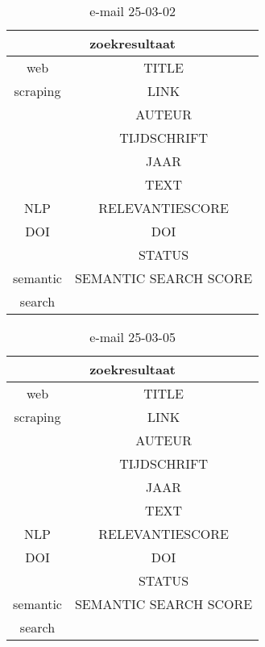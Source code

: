 \begin{table}[h!]
    \caption{e-mail 25-03-02}
    \centering
    \begin{tabular}{|c|c|} 
        \hline
        \multicolumn{2}{|c|}{\textbf{zoekresultaat}} \\
        \hline
        web &TITLE\\
        scraping&LINK\\
        &AUTEUR\\
        &TIJDSCHRIFT\\
        &JAAR\\
        &TEXT\\
        \hline
        NLP&RELEVANTIESCORE\\
        \hline
        DOI&DOI\\
        &STATUS\\
        \hline
        semantic&SEMANTIC SEARCH SCORE\\
        search&\\
        \hline
    \end{tabular}
    \label{table:email20250302}
\end{table}
\begin{table}[h!]
    \caption{e-mail 25-03-05}
    \centering
    \begin{tabular}{|c|c|} 
        \hline
        \multicolumn{2}{|c|}{\textbf{zoekresultaat}} \\
        \hline
        web &TITLE\\
        scraping&LINK\\
        &AUTEUR\\
        &TIJDSCHRIFT\\
        &JAAR\\
        &TEXT\\
        \hline
        NLP&RELEVANTIESCORE\\
        \hline
        DOI&DOI\\
        &STATUS\\
        \hline
        semantic&SEMANTIC SEARCH SCORE\\
        search&\\
        \hline
    \end{tabular}
    \label{table:email20250305}
\end{table}
